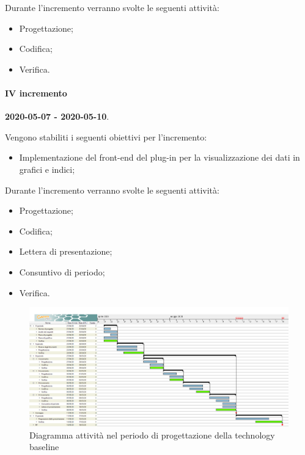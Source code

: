 \documentclass[../piano-di-progetto.tex]{subfiles}
\begin{document}
Durante l'incremento verranno svolte le seguenti attività: 
\begin{itemize}
    \item Progettazione;
    \item Codifica;
    \item Verifica.
\end{itemize}


\paragraph{IV incremento}
\textbf{2020-05-07 - 2020-05-10}. 
 
 Vengono stabiliti i seguenti obiettivi per l'incremento:
 \begin{itemize}
     \item Implementazione del front-end del plug-in per la visualizzazione dei dati in grafici e indici;
 \end{itemize}

Durante l'incremento verranno svolte le seguenti attività: 
\begin{itemize}
    \item Progettazione;
    \item Codifica;
    \item Lettera di presentazione;
    \item Consuntivo di periodo;
    \item Verifica.
\end{itemize}



\newpage
\begin{landscape}
    \begin{figure}[H]
        \centering
        \includegraphics[width=24cm]{img/progettazione.png}
        \caption{Diagramma attività nel periodo di progettazione della technology baseline}
      \end{figure}
\end{landscape}
\end{document}
